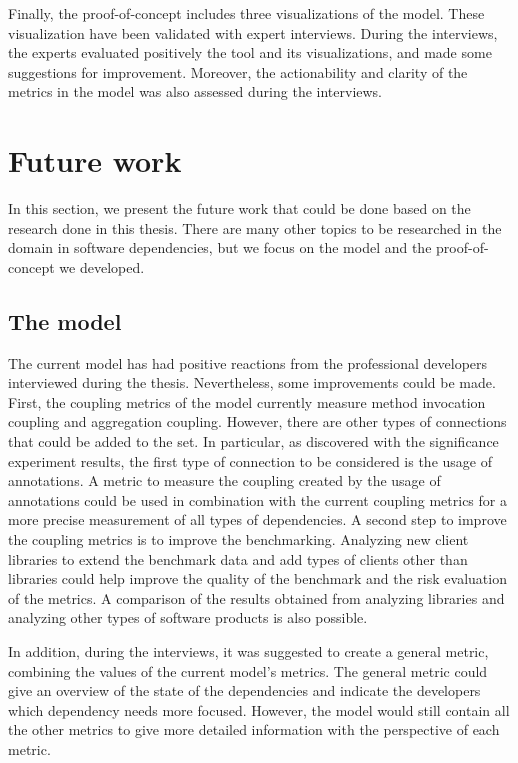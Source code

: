 Finally, the proof-of-concept includes three visualizations of the model. These visualization have been validated with expert interviews. During the interviews, the experts evaluated positively the tool and its visualizations, and made some suggestions for improvement. Moreover, the actionability and clarity of the metrics in the model was also assessed during the interviews.

\section{Future work} \label{sec:future_work}
In this section, we present the future work that could be done based on the research done in this thesis. There are many other topics to be researched in the domain in software dependencies, but we focus on the model and the proof-of-concept we developed.

\subsection{The model}

The current model has had positive reactions from the professional developers interviewed during the thesis. Nevertheless, some improvements could be made. First, the coupling metrics of the model currently measure method invocation coupling and aggregation coupling. However, there are other types of connections that could be added to the set. In particular, as discovered with the significance experiment results, the first type of connection to be considered is the usage of annotations. A metric to measure the coupling created by the usage of annotations could be used in combination with the current coupling metrics for a more precise measurement of all types of dependencies. A second step to improve the coupling metrics is to improve the benchmarking. Analyzing new client libraries to extend the benchmark data and add types of clients other than libraries could help improve the quality of the benchmark and the risk evaluation of the metrics. A comparison of the results obtained from analyzing libraries and analyzing other types of software products is also possible.

In addition, during the interviews, it was suggested to create a general metric, combining the values of the current model's metrics. The general metric could give an overview of the state of the dependencies and indicate the developers which dependency needs more focused. However, the model would still contain all the other metrics to give more detailed information with the perspective of each metric.

